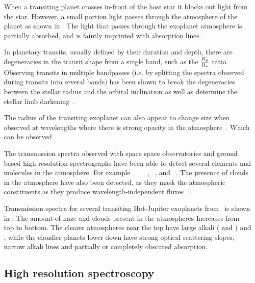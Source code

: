 When a transiting planet crosses in-front of the host star it blocks out light from the star.
However, a small portion light passes through the atmosphere of the planet as shown in .
The light that passes through the exoplanet atmosphere is partially absorbed, and is faintly imprinted with absorption lines.


In planetary transits, usually defined by their duration and depth, there are degeneracies in the transit shape from a single band, such as the \(\frac{\textrm{R}_{p}}{\textrm{R}_{\star}}\) ratio.
Observing transits in multiple bandpasses (i.e. by splitting the spectra observed during transits into several bands)  has been shown to break the degeneracies between the stellar radius and the orbital inclination as well as determine the stellar limb darkening~\citep{jha_multicolor_2000, knutson_using_2007}.

The radius of the transiting exoplanet can also appear to change size when observed at wavelengths where there is strong opacity in the atmosphere~\citep[e.g.][]{burrows_radii_2000, seager_theoretical_2000}. Which can be observed

The transmission spectra observed with space space observatories and ground based high resolution spectrographs have been able to detect several elements and molecules in the atmosphere. For example ~\citep{charbonneau_detection_2002, redfield_sodium_2008, wyttenbach_spectrally_2015, nikolov_vlt_2016} ~\cite{tinetti_water_2007, brogi_carbon_2014} ~\citep{brogi_carbon_2014, snellen_mass_2018}, ~\citep{redfield_extrasolar_2010 },  and ~\citep{hoeijmakers_atomic_2018}.
The presence of clouds in the atmosphere have also been detected, as they mask the atmospheric constituents as they produce wavelength-independent fluxes ~\citep[e.g.][]{barman_clouds_2011, kreidberg_clouds_2014, sing_continuum_2016}.

Transmission spectra for several transiting Hot-Jupiter exoplanets from~\citet{sing_continuum_2016} is shown in . The amount of haze and clouds present in the atmospheres Increases from top to bottom. The clearer atmospheres near the top have large alkali ( and ) and , while the cloudier planets lower down have strong optical scattering slopes, narrow alkali lines and partially or completely obscured  absorption.


\subsection{High resolution spectroscopy}

